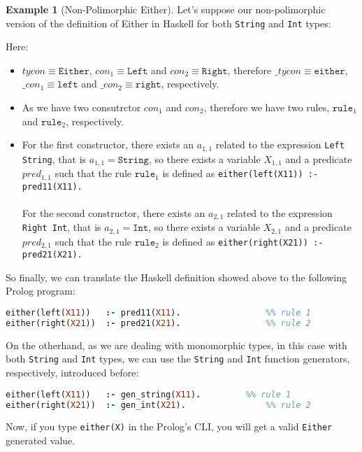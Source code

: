 \documentclass{report}
\theoremstyle{definition}
\newtheorem{example}{Example}[section]
\theoremstyle{definition}
\newcommand{\ttt}[1]{\texttt{#1}}
\begin{document}
\begin{example}[Non-Polimorphic Either]
	Let's suppose our non-polimorphic version of the definition of Either in Haskell for both \ttt{String} and \ttt{Int} types:
	
	Here:
	\begin{itemize}
		\item $tycon \equiv \ttt{Either}$, $con_1 \equiv \ttt{Left}$ and $con_2 \equiv \ttt{Right}$, therefore $\_tycon \equiv \ttt{either}$, $\_con_1 \equiv \ttt{left}$ and $\_con_2 \equiv \ttt{right}$, respectively.
		\item As we have two consutrctor $con_1$ and $con_2$, therefore we have two rules, $\ttt{rule}_1$ and $\ttt{rule}_2$, respectively.
		\item For the first constructor, there exists an $a_{1,1}$ related to the expression \ttt{Left String}, that is $a_{1,1} = \ttt{String}$, so there exists a variable $X_{1,1}$ and a predicate $pred_{1,1}$ such that the rule $\ttt{rule}_1$ is defined as \ttt{either(left(X11)) :- pred11(X11).}\\\\
		For the second constructor, there exists an $a_{2,1}$ related to the expression \ttt{Right Int}, that is $a_{2,1} = \ttt{Int}$, so there exists a variable $X_{2,1}$ and a predicate $pred_{2,1}$ such that the rule $\ttt{rule}_2$ is defined as \ttt{either(right(X21)) :- pred21(X21).}
	\end{itemize}
	So finally, we can translate the Haskell definition showed above to the following Prolog program:\\
\begin{lstlisting}[language=Prolog]
either(left(X11)) 	:- pred11(X11).					%% rule 1
either(right(X21)) 	:- pred21(X21).					%% rule 2
\end{lstlisting}
On the otherhand, as we are dealing with monomorphic types, in this case with both \ttt{String} and \ttt{Int} types, we can use the \ttt{String} and \ttt{Int} function generators, respectively, introduced before:\\
\begin{lstlisting}[language=Prolog]
either(left(X11)) 	:- gen_string(X11).			%% rule 1
either(right(X21)) 	:- gen_int(X21).				%% rule 2
\end{lstlisting}
Now, if you type \ttt{either(X)} in the Prolog's CLI, you will get a valid \ttt{Either} generated value.
\end{example}
\end{document}
